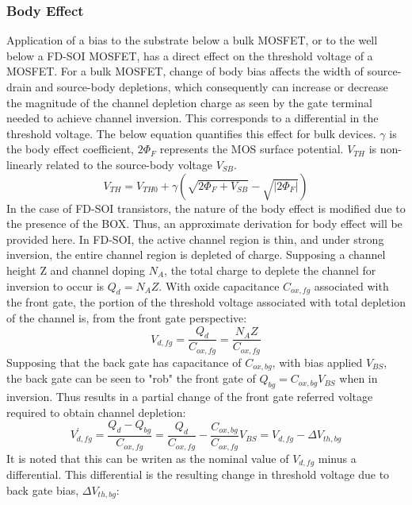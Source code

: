 	\subsubsection{Body Effect}
	Application of a bias to the substrate below a bulk MOSFET, or to the well below a FD-SOI MOSFET, has a direct effect on the threshold voltage of a MOSFET. For a bulk MOSFET, change of body bias affects the width of source-drain and source-body depletions, which consequently can increase or decrease the magnitude of the channel depletion charge as seen by the gate terminal needed to achieve channel inversion. This corresponds to a differential in the threshold voltage. The below equation \cite{razavi_2017} quantifies this effect for bulk devices. $\gamma$ is the body effect coefficient, $2\Phi_F$ represents the MOS surface potential. $V_{TH}$ is non-linearly related to the source-body voltage $V_{SB}$.
	\begin{equation}
		V_{TH} = V_{TH0} + \gamma\left( \sqrt{2\Phi_F + V_{SB}} - \sqrt{|2\Phi_F|} \right)
	\end{equation}
	In the case of FD-SOI transistors, the nature of the body effect is modified due to the presence of the BOX. Thus, an approximate derivation for body effect will be provided here. In FD-SOI, the active channel region is thin, and under strong inversion, the entire channel region is depleted of charge. Supposing a channel height Z and channel doping $N_A$, the total charge to deplete the channel for inversion to occur is $Q_{d} = N_AZ$. With oxide capacitance $C_{ox,fg}$ associated with the front gate, the portion of the threshold voltage associated with total depletion of the channel is, from the front gate perspective:
	\begin{equation}
		V_{d,fg} = \frac{Q_d}{C_{ox,fg}} = \frac{N_AZ}{C_{ox,fg}} 
	\end{equation}
	Supposing that the back gate has capacitance of $C_{ox,bg}$, with bias applied $V_{BS}$, the back gate can be seen to "rob" the front gate of $Q_{bg} = C_{ox,bg}V_{BS}$ when in inversion. Thus results in a partial change of the front gate referred voltage required to obtain channel depletion:
	\begin{equation}
		V_{d,fg}^{'} = \frac{Q_d-Q_{bg}}{C_{ox,fg}} = \frac{Q_d}{C_{ox,fg}} - \frac{C_{ox,bg}}{C_{ox,fg}}V_{BS} = V_{d,fg}-\Delta V_{th,bg}
	\end{equation}
	It is noted that this can be writen as the nominal value of $V_{d,fg}$ minus a differential. This differential is the resulting change in threshold voltage due to back gate bias, $\Delta V_{th,bg}$:
